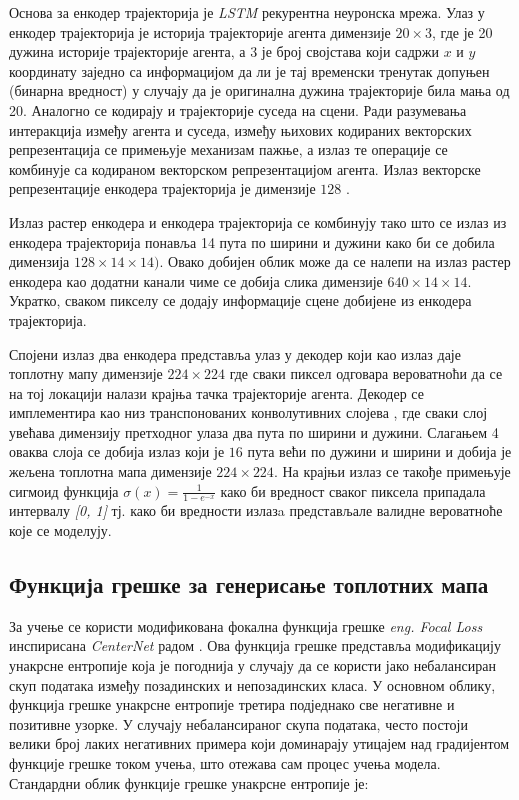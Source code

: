\documentclass[11pt,oneside]{memoir}
\begin{document}
Основа за енкодер трајекторија је \textit{LSTM} рекурентна неуронска мрежа. Улаз у енкодер трајекторија је
историја трајекторије агента димензије $20\times 3$, 
где је 20 дужина историје трајекторије агента, а 3 је број својстава који садржи $x$ и $y$ координату заједно са информацијом да ли је тај 
временски тренутак допуњен (бинарна вредност) у случају да је оригинална дужина трајекторије била мања од 20. Аналогно се кодирају и
трајекторије суседа на сцени. Ради разумевања интеракција између агента и суседа, између њихових кодираних векторских репрезентација
се примењује механизам пажње, а излаз те операције се комбинује
са кодираном векторском репрезентацијом агента. Излаз векторске репрезентације енкодера трајекторија је димензије $128$
\cite{home}. 

Излаз растер енкодера и енкодера трајекторија се комбинују тако што се излаз из енкодера трајекторија понавља 14 пута по
ширини и дужини како би се добила
димензија $128\times 14\times 14)$. Овако добијен облик може да се налепи на излаз растер енкодера као додатни канали 
чиме се добија слика димензије $640\times 14\times 14$. Укратко, сваком пикселу се додају информације сцене добијене из енкодера трајекторија.

Спојени излаз два енкодера представља улаз у декодер који као излаз даје топлотну мапу димензије $224\times 224$ где сваки пиксел одговара
вероватноћи да се на тој локацији налази крајња тачка трајекторије агента. Декодер се имплементира као низ транспонованих конволутивних слојева
\cite{guide_to_cnn_arithm}, где сваки слој увећава димензију претходног улаза два пута по ширини и дужини. 
Слагањем 4 оваква слоја се добија излаз који је $16$ пута
већи по дужини и ширини и добија је жељена топлотна мапа димензије $224\times 224$. 
На крајњи излаз се такође примењује сигмоид функција $\sigma(x) = \frac{1}{1-e^{-x}}$ како би вредност сваког
пиксела припадала интервалу \textit{[0, 1]} тј. како би вредности излазa представљале валидне вероватноће које се моделују. 

\subsection{Функција грешке за генерисање топлотних мапа}

За учење се користи модификована фокална функција грешке \textit{eng. Focal Loss} 
инспирисана \textit{CenterNet} радом \cite{centernet, focal_loss}. Ова функција грешке
представља модификацију унакрсне ентропије која је погоднија у случају да се користи јако небалансиран скуп података између позадинских и непозадинских
класа. У основном облику, функција грешке унакрсне ентропије третира подједнако све негативне и позитивне узорке. 
У случају небалансираног скупа података, често постоји велики број лаких негативних примера који доминарају утицајем над градијентом
функције грешке током учења, што отежава сам процес учења модела. Стандардни облик функције грешке унакрсне ентропије је: 
\end{document}

